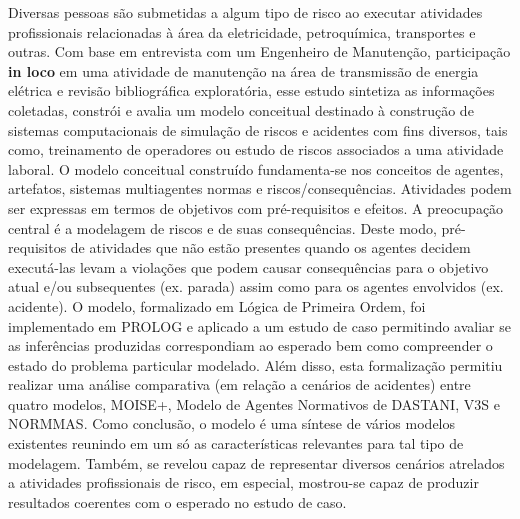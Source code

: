 Diversas pessoas são submetidas a algum tipo de risco ao executar atividades profissionais relacionadas à área da eletricidade, petroquímica, transportes e outras. Com base em entrevista com um Engenheiro de Manutenção, participação \textbf{in loco} em uma atividade de manutenção na área de transmissão de energia elétrica e revisão bibliográfica exploratória, esse estudo sintetiza as informações coletadas, constrói e avalia um modelo conceitual destinado à construção de sistemas computacionais de simulação de riscos e acidentes com fins diversos, tais como, treinamento de operadores ou estudo de riscos associados a uma atividade laboral. O modelo conceitual construído fundamenta-se nos conceitos de agentes, artefatos, sistemas multiagentes normas e riscos/consequências. Atividades podem ser expressas em termos de objetivos com pré-requisitos e efeitos. A preocupação central é a modelagem de riscos e de suas consequências. Deste modo, pré-requisitos de atividades que não estão presentes quando os agentes decidem executá-las levam a violações que podem causar consequências para o objetivo atual e/ou subsequentes (ex. parada) assim como para os agentes envolvidos (ex. acidente). O modelo, formalizado em Lógica de Primeira Ordem, foi implementado em PROLOG e aplicado a um estudo de caso permitindo avaliar se as inferências produzidas correspondiam ao esperado bem como compreender o estado do problema particular modelado. Além disso, esta formalização permitiu realizar uma análise comparativa (em relação a cenários de acidentes) entre quatro modelos, MOISE+, Modelo de Agentes Normativos de DASTANI, V3S e NORMMAS. Como conclusão, o modelo é uma síntese de vários modelos existentes reunindo em um só as características relevantes para tal tipo de modelagem. Também, se revelou capaz de representar diversos cenários atrelados a atividades profissionais de risco, em especial, mostrou-se capaz de produzir resultados coerentes com o esperado no estudo de caso.